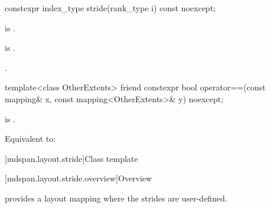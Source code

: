 %
\begin{itemdecl}
constexpr index_type stride(rank_type i) const noexcept;
\end{itemdecl}

\begin{itemdescr}
\pnum
\constraints
{} is .

\pnum
\expects
{} is .

\pnum
\returns
{}.
\end{itemdescr}

%
\begin{itemdecl}
template<class OtherExtents>
  friend constexpr bool operator==(const mapping& x, const mapping<OtherExtents>& y) noexcept;
\end{itemdecl}

\begin{itemdescr}
\pnum
\constraints
{} is .

\pnum
\effects
Equivalent to: 
\end{itemdescr}

[mdspan.layout.stride]{Class template }

[mdspan.layout.stride.overview]{Overview}

\pnum
{} provides a layout mapping
where the strides are user-defined.

